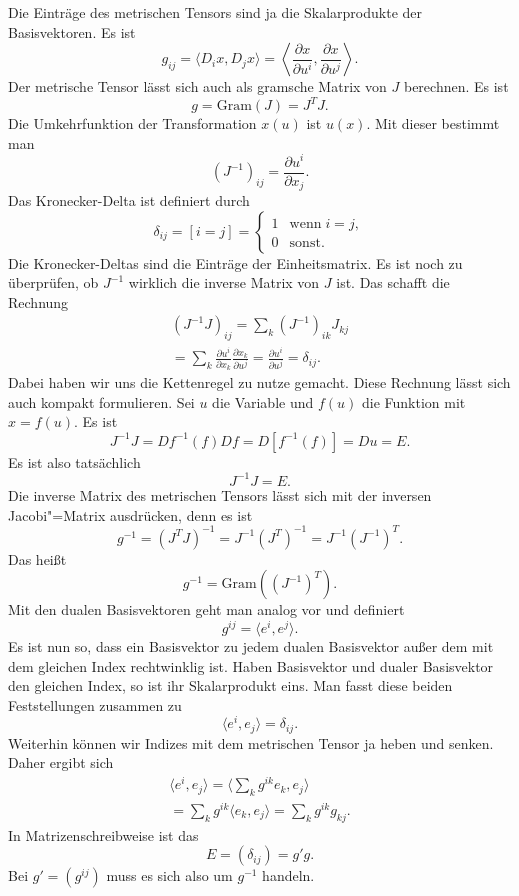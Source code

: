 \documentclass[a4paper,10pt,fleqn,twocolumn,twoside]{article}
\begin{document}
Die Einträge des metrischen Tensors sind ja die Skalarprodukte der
Basisvektoren. Es ist
\[g_{ij} = \langle D_i x, D_j x\rangle
=  \left\langle \frac{\partial x}{\partial u^i},
\frac{\partial x}{\partial u^j}\right\rangle.\]
Der metrische Tensor lässt sich auch als gramsche Matrix von $J$
berechnen. Es ist
\[g = \mathrm{Gram}(J) = J^T\!J.\]
Die Umkehrfunktion der Transformation $x(u)$ ist $u(x)$.
Mit dieser bestimmt man
\[(J^{-1})_{ij} = \frac{\partial u^i}{\partial x_j}.\]
Das Kronecker-Delta ist definiert durch
\[\delta_{ij} = [i=j]
= \begin{cases}
1 & \mathrm{wenn}\;i=j,\\
0 & \mathrm{sonst}.
\end{cases}\]
Die Kronecker-Deltas sind die Einträge der Einheitsmatrix.
Es ist noch zu überprüfen, ob $J^{-1}$ wirklich die inverse Matrix
von $J$ ist. Das schafft die Rechnung
\begin{gather*}
(J^{-1}J)_{ij} = \sum_{k}(J^{-1})_{ik}J_{kj}\\
= \sum_{k} \frac{\partial u^i}{\partial x_k}
\frac{\partial x_k}{\partial u^j}
= \frac{\partial u^i}{\partial u^j}
= \delta_{ij}.
\end{gather*}
Dabei haben wir uns die Kettenregel zu nutze gemacht. Diese Rechnung
lässt sich auch kompakt formulieren. Sei $u$ die Variable und
$f(u)$ die Funktion mit $x=f(u)$. Es ist
\[J^{-1}J = Df^{-1}(f)Df = D[f^{-1}(f)] = Du = E.\]
Es ist also tatsächlich
\[J^{-1}J = E.\]
Die inverse Matrix des metrischen Tensors lässt sich mit der inversen
Jacobi"=Matrix ausdrücken, denn es ist
\[g^{-1} = (J^T\!J)^{-1} = J^{-1}(J^T)^{-1} = J^{-1}(J^{-1})^T.\]
Das heißt
\[g^{-1} = \mathrm{Gram}((J^{-1})^T).\]
%
Mit den dualen Basisvektoren geht man analog vor und definiert
\[g^{ij} = \langle e^i, e^j\rangle.\]
Es ist nun so, dass ein Basisvektor zu jedem dualen Basisvektor außer
dem mit dem gleichen Index rechtwinklig ist. Haben Basisvektor und
dualer Basisvektor den gleichen Index, so ist ihr Skalarprodukt eins.
Man fasst diese beiden Feststellungen zusammen zu
\[\langle e^i,e_j\rangle = \delta_{ij}.\]
%
Weiterhin können wir Indizes mit dem metrischen Tensor ja heben und
senken. Daher ergibt sich
\begin{gather*}\langle e^i,e_j\rangle
= \langle \sum_{k} g^{ik}e_k,e_j\rangle\\
= \sum_{k}g^{ik}\langle e_k,e_j\rangle
= \sum_{k}g^{ik}g_{kj}.
\end{gather*}
In Matrizenschreibweise ist das
\[E = (\delta_{ij}) =  g'g.\]
Bei $g'=(g^{ij})$ muss es sich also um $g^{-1}$ handeln.
\end{document}
